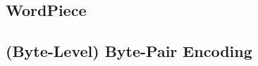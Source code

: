 \documentclass[12pt]{article}
\begin{document}
\subsection{WordPiece}


\subsection{(Byte-Level) Byte-Pair Encoding}


\newpage


\end{document}
